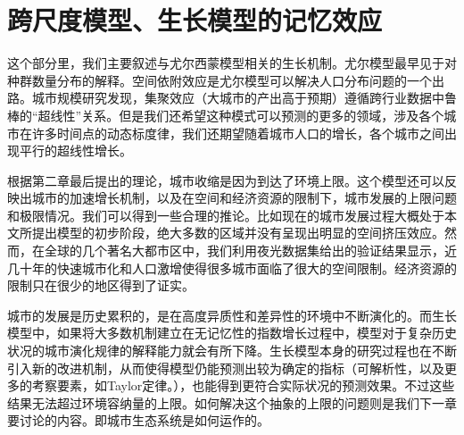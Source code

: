 \section{跨尺度模型、生长模型的记忆效应}

这个部分里，我们主要叙述与尤尔西蒙模型相关的生长机制。尤尔模型最早见于对种群数量分布的解释\cite{yule1925ii}。空间依附效应是尤尔模型可以解决人口分布问题的一个出路\cite{Willis}。城市规模研究发现\cite{Keuschnigg13759}，集聚效应（大城市的产出高于预期）遵循跨行业数据中鲁棒的“超线性”关系。但是我们还希望这种模式可以预测的更多的领域，涉及各个城市在许多时间点的动态标度律，我们还期望随着城市人口的增长，各个城市之间出现平行的超线性增长。

根据第二章最后提出的理论，城市收缩是因为到达了环境上限。这个模型还可以反映出城市的加速增长机制，以及在空间和经济资源的限制下，城市发展的上限问题和极限情况。我们可以得到一些合理的推论。比如现在的城市发展过程大概处于本文所提出模型的初步阶段，绝大多数的区域并没有呈现出明显的空间挤压效应。然而，在全球的几个著名大都市区中，我们利用夜光数据集给出的验证结果显示，近几十年的快速城市化和人口激增使得很多城市面临了很大的空间限制。经济资源的限制只在很少的地区得到了证实。

城市的发展是历史累积的，是在高度异质性和差异性的环境中不断演化的。而生长模型中，如果将大多数机制建立在无记忆性的指数增长过程中，模型对于复杂历史状况的城市演化规律的解释能力就会有所下降。生长模型本身的研究过程也在不断引入新的改进机制，从而使得模型仍能预测出较为确定的指标（可解析性，以及更多的考察要素，如Taylor定律\cite{Giometto7755}。），也能得到更符合实际状况的预测效果。不过这些结果无法超过环境容纳量的上限。如何解决这个抽象的上限的问题则是我们下一章要讨论的内容。即城市生态系统是如何运作的。